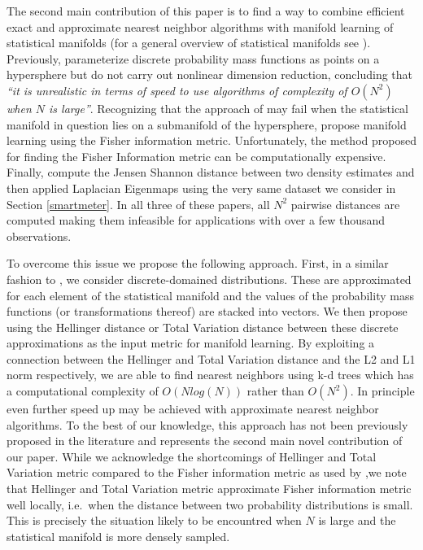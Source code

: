 \documentclass[11pt,a4paper,]{article}
\begin{document}
The second main contribution of this paper is to find a way to combine efficient exact and approximate nearest neighbor algorithms with manifold learning of statistical manifolds (for a general overview of statistical manifolds see \textcite{amari2016}). Previously, \textcite{lee2007} parameterize discrete probability mass functions as points on a hypersphere but do not carry out nonlinear dimension reduction, concluding that \emph{``it is unrealistic in terms of speed to use algorithms of complexity of \(O(N^2)\) when \(N\) is large''}. Recognizing that the approach of \textcite{lee2007} may fail when the statistical manifold in question lies on a submanifold of the hypersphere, \textcite{carter2009} propose manifold learning using the Fisher information metric. Unfortunately, the method proposed for finding the Fisher Information metric can be computationally expensive. Finally, \textcite{Hyndman2018-nq} compute the Jensen Shannon distance between two density estimates and then applied Laplacian Eigenmaps using the very same dataset we consider in Section \ref{smartmeter}. In all three of these papers, all \(N^2\) pairwise distances are computed making them infeasible for applications with over a few thousand observations.

To overcome this issue we propose the following approach. First, in a similar fashion to \textcite{lee2007}, we consider discrete-domained distributions. These are approximated for each element of the statistical manifold and the values of the probability mass functions (or transformations thereof) are stacked into vectors. We then propose using the Hellinger distance or Total Variation distance between these discrete approximations as the input metric for manifold learning. By exploiting a connection between the Hellinger and Total Variation distance and the L2 and L1 norm respectively, we are able to find nearest neighbors using k-d trees which has a computational complexity of \(O(Nlog(N))\) rather than \(O(N^2)\). In principle even further speed up may be achieved with approximate nearest neighbor algorithms. To the best of our knowledge, this approach has not been previously proposed in the literature and represents the second main novel contribution of our paper. While we acknowledge the shortcomings of Hellinger and Total Variation metric compared to the Fisher information metric as used by \textcite{carter2009} ,we note that Hellinger and Total Variation metric approximate Fisher information metric well locally, i.e.~when the distance between two probability distributions is small. This is precisely the situation likely to be encountred when \(N\) is large and the statistical manifold is more densely sampled.
\end{document}
